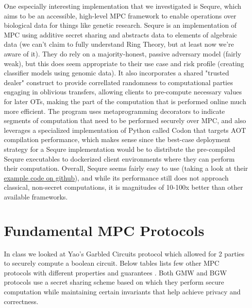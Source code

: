\documentclass[11pt]{article}
\begin{document}
One especially interesting implementation that we investigated is Sequre, which aims to be an accessible, high-level MPC framework to enable operations over 
biological data for things like genetic research. \cite{10} Sequre is an implementation of MPC using additive secret sharing and abstracts data to elements of algebraic data 
 (we can't claim to fully understand Ring Theory, but at least now we're aware of it). They do rely on a majority-honest, passive adversary model (fairly weak), but this does seem appropriate to their use case and risk profile (creating classifier models using genomic data). 
It also incorporates a shared "trusted dealer" construct to provide correllated randomness to computational parties engaging in oblivious transfers, allowing clients 
to pre-compute necessary values for later OTs, making the part of the computation that is performed online much more efficient. \cite{12} The program uses metaprogramming decorators to indicate 
segments of computation that need to be performed securely over MPC, and also leverages a specialized implementation of Python called Codon that targets AOT compilation performance, which 
makes sense since the best-case deployment strategy for a Sequre implementation would be to distribute the pre-compiled Sequre executables to dockerized client environments 
where they can perform their computation. Overall, Sequre seems fairly easy to use (taking a look at their \href{https://github.com/0xTCG/sequre/tree/master/example}{example code on github}), and while its 
performance still does not approach classical, non-secret computations, it is magnitudes of 10-100x better than other available frameworks.


\section*{Fundamental MPC Protocols}

In class we looked at Yao's Garbled Circuits protocol which allowed for 2 parties to securely compute a boolean circuit. Below tables lists few other MPC protocols with different properties and guarantees \cite{13, 14}. Both GMW and BGW protocols use a secret sharing scheme based on which they perform secure computation while maintaining certain invariants that help achieve privacy and correctness.
\end{document}
